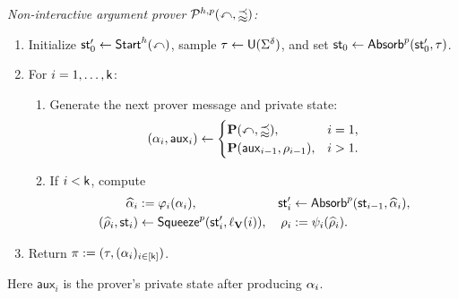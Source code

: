 \begin{construction}
\emph{Non-interactive argument prover \(\mathcal{P}^{h,p}(\mathbb{x},\mathbb{w})\):}
\begin{enumerate}
\item Initialize \(\mathsf{st}'_0\leftarrow\mathsf{Start}^h(\mathbb{x})\), sample
  \(\tau\leftarrow\mathsf{U}(\Sigma^{\delta})\), and set
  \(\mathsf{st}_0\leftarrow\mathsf{Absorb}^p(\mathsf{st}'_0,\tau)\).
\item For \(i=1,\ldots,\mathsf{k}\):
  \begin{enumerate}
  \item Generate the next prover message and private state:
  \begin{equation*}
    (\alpha_i,\mathsf{aux}_i)\leftarrow
    \begin{cases}
      \mathbf{P}(\mathbb{x},\mathbb{w}),&i=1,\\
      \mathbf{P}(\mathsf{aux}_{i-1},\rho_{i-1}),&i>1.
    \end{cases}
  \end{equation*}
  \item If \(i<\mathsf{k}\), compute
  \begin{equation*}
  \begin{aligned}
    \widehat{\alpha}_i&:=\varphi_i(\alpha_i),&
    \mathsf{st}'_i&\leftarrow\mathsf{Absorb}^p(\mathsf{st}_{i-1},\widehat{\alpha}_i),\\
    (\widehat{\rho}_i,\mathsf{st}_i)&\leftarrow\mathsf{Squeeze}^p(\mathsf{st}'_i,\ell_{\mathbf{V}}(i)),&
    \rho_i&:=\psi_i(\widehat{\rho}_i).
  \end{aligned}
  \end{equation*}
  \end{enumerate}
\item Return \(\pi:=(\tau,(\alpha_i)_{i\in[\mathsf{k}]})\).
\end{enumerate}
Here \(\mathsf{aux}_i\) is the prover's private state after producing \(\alpha_i\).


\end{construction}

